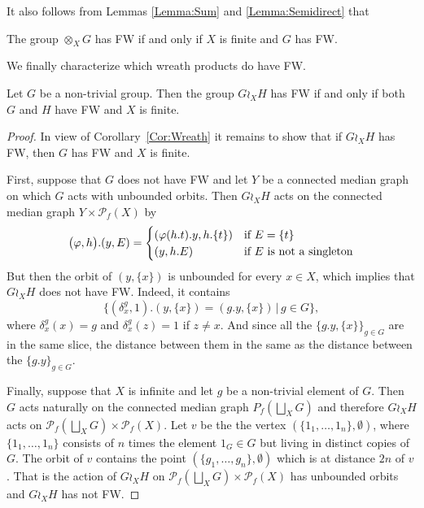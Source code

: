 It also follows from Lemmas \ref{Lemma:Sum} and \ref{Lemma:Semidirect} that
\begin{cor}
The group $\otimes_X G$ has FW if and only if $X$ is finite and $G$ has FW.
\end{cor}

We finally characterize which wreath products do have FW.
\begin{prop}\label{Prop:Median}
Let $G$ be a non-trivial group.
Then the group $G\wr_X H$ has FW if and only if both $G$ and $H$ have FW and $X$ is finite.
\end{prop}
\begin{proof}
In view of Corollary~\ref{Cor:Wreath} it remains to show that if $G\wr_X H$ has FW, then $G$ has FW and $X$ is finite.

First, suppose that $G$ does not have FW and let $Y$ be a connected median graph on which $G$ acts with unbounded orbits.
Then $G\wr_X H$ acts on the connected median graph $Y\times \mathcal P_f(X)$ by
\[
	\bigl(\phi,h\bigr).(y,E)=
	\begin{cases}
	(\phi(h.t).y,h.\{t\})&\textnormal{if $E=\{t\}$}\\
	(y,h.E)&\textnormal{if $E$ is not a singleton}
	\end{cases}
\]
But then the orbit of $(y,\{x\})$ is unbounded for every $x\in X$, which implies that $G\wr_X H$ does not have FW.
Indeed, it contains
\[
	\{(\delta_{x}^g,1).(y,\{x\})=(g.y,\{x\})\,|\,g\in G\},
\]
where $\delta_{x}^g(x)=g$ and $\delta_{x}^g(z)=1$ if $z\neq x$. 
And since all the $\{g.y,\{x\}\}_{g\in G}$ are in the same slice, the distance between them in the same as the distance between the $\{g.y\}_{g\in G}$.

Finally, suppose that $X$ is infinite and let $g$ be a non-trivial element of $G$.
Then $G$ acts naturally on the connected median graph $P_f(\bigsqcup_XG)$ and therefore $G\wr_X H$ acts on $\mathcal P_f(\bigsqcup_XG)\times \mathcal P_f(X)$.
Let $v$ be the the vertex $(\{1_1,\dots, 1_n\},\emptyset)$, where $\{1_1,\dots, 1_n\}$ consists of $n$ times the element $1_G\in G$ but living in distinct copies of $G$.
The orbit of $v$ contains the point $(\{g_1,\dots, g_n\},\emptyset)$ which is at distance $2n$ of $v$.
That is the action of $G\wr_X H$ on $\mathcal P_f(\bigsqcup_XG)\times \mathcal P_f(X)$ has unbounded orbits and $G\wr_X H$ has not FW.
\end{proof}

